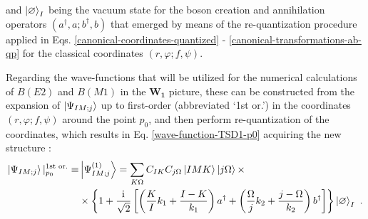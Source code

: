 and $\ket{\varnothing}_I$ being the vacuum state for the boson creation and annihilation operators $(a^\dagger,a;b^\dagger,b)$ that emerged by means of the re-quantization procedure applied in Eqs. \ref{canonical-coordinates-quantized} - \ref{canonical-transformations-ab-qp} for the classical coordinates $(r,\varphi;f,\psi)$.

Regarding the wave-functions that will be utilized for the numerical calculations of $B(E2)$ and $B(M1)$ in the $\mathbf{W_1}$ picture, these can be constructed from the expansion of $\ket{\Psi_{IM;j}}$ up to first-order (abbreviated `1st or.') in the coordinates $(r,\varphi;f,\psi)$ around the point $p_0$, and then perform re-quantization of the coordinates, which results in Eq. \ref{wave-function-TSD1-p0} acquiring the new structure \cite{raduta2017semiclassical,raduta2020approach,raduta2020towards}:
\begin{align}
    \ket{\Psi_{IM;j}}|_{p_0}^{\text{1st or.}}\equiv&\ket{\Psi_{IM;j}^{(1)}}=\sum_{K\Omega}C_{IK}C_{j\Omega}\ket{IMK}\ket{j\Omega}\times\nonumber\\
        &\times\left\{1+\frac{\iu}{\sqrt{2}}\left[\left(\frac{K}{I}k_1+\frac{I-K}{k_1}\right)a^\dagger+\left(\frac{\Omega}{j}k_2+\frac{j-\Omega}{k_2}\right)b^\dagger\right]\right\}\ket{\varnothing}_I\ .
    \label{wave-function-TSD1-p0-first-order}
\end{align}

